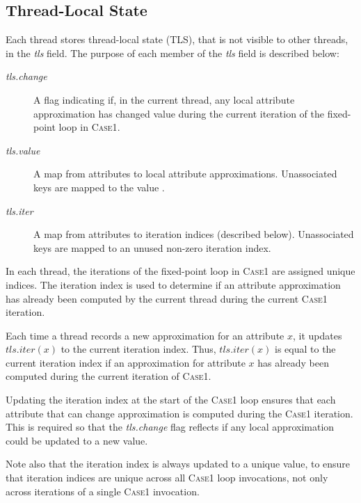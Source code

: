 {\begin{algorithm*}
\begin{algorithmic}
  \end{algorithmic}
\end{algorithm*}


\subsection{Thread-Local State}
\label{thread-local-state}

Each thread stores thread-local state (TLS), that is not visible to other threads,
in the \emph{tls} field.
The purpose of each member of the \emph{tls} field is described below:

\begin{description}
  \item[\emph{tls.change}] A flag indicating if, in the current thread,
    any local attribute approximation has changed value during the current iteration
    of the fixed-point loop in \textsc{Case1}.
  \item[\emph{tls.value}] A map from attributes to local attribute approximations.
    Unassociated keys are mapped to the value \none{}.
  \item[\emph{tls.iter}] A map from attributes to iteration indices (described below).
    Unassociated keys are mapped to an unused non-zero iteration index.
\end{description}

In each thread, the iterations of the fixed-point loop in \textsc{Case1} are assigned unique
indices. The iteration index is used to determine if an attribute approximation has already been
computed by the current thread during the current \textsc{Case1} iteration.

Each time a thread records a new
approximation for an attribute $x$,
it updates $\mathit{tls}.\mathit{iter}(x)$ to the current iteration index.  Thus,
$\mathit{tls}.\mathit{iter}(x)$ is equal to the current iteration index if
an approximation for attribute $x$ has
already been computed during the current iteration of \textsc{Case1}.

Updating the iteration index at the start of the \textsc{Case1} loop
ensures that each attribute that can change approximation
is computed during the \textsc{Case1} iteration.
This is required so that the \emph{tls.change} flag
reflects if any local approximation could be updated to a new value.

Note also that the iteration index is always updated to a unique value, to
ensure that iteration indices are unique across all \textsc{Case1} loop invocations,
not only across iterations of a single \textsc{Case1} invocation.


}
